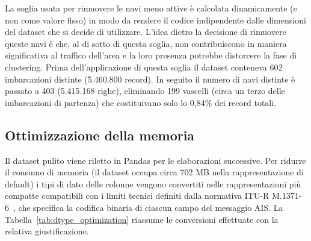 La soglia usata per rimuovere le navi meno attive è calcolata dinamicamente (e non come valore fisso) in modo
da rendere il codice indipendente dalle dimensioni del dataset che si decide di utilizzare. L'idea dietro la decisione di rimuovere queste navi
 è che, al di sotto di questa soglia, non contribuiscono in maniera significativa al traffico dell'area e la loro presenza potrebbe 
distorcere la fase di clustering.
Prima dell'applicazione di questa soglia il dataset conteneva 602 imbarcazioni distinte (5.460.800 record). In seguito il numero di 
navi distinte è passato a 403 (5.415.168 righe), eliminando 199 vascelli (circa un terzo delle imbarcazioni di partenza) che costituivano 
solo lo 0,84\% dei record totali. 

\subsection{Ottimizzazione della memoria}\label{ssec:meth_memory}

Il dataset pulito viene riletto in Pandas per le elaborazioni successive. Per ridurre il
consumo di memoria (il dataset occupa circa 702 MB nella rappresentazione di default)
i tipi di dato delle colonne vengono convertiti nelle rappresentazioni più compatte
compatibili con i limiti tecnici definiti dalla normativa ITU-R M.1371-6~\cite{itu2026},
che specifica la codifica binaria di ciascun campo del messaggio AIS\@.
La Tabella~\ref{tab:dtype_optimization} riassume le conversioni effettuate con la relativa
giustificazione.

